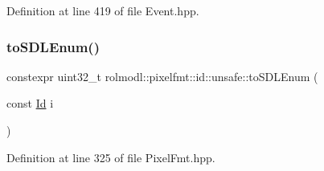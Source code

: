 Definition at line 419 of file Event.\+hpp.

\mbox{\label{namespacerolmodl_1_1pixelfmt_1_1id_1_1unsafe_a0e2c2fca9f1bc5d345511929b84cc97d}} 
\subsubsection{\texorpdfstring{toSDLEnum()}{toSDLEnum()}}
{\footnotesize\ttfamily constexpr uint32\+\_\+t rolmodl\+::pixelfmt\+::id\+::unsafe\+::to\+S\+D\+L\+Enum (\begin{DoxyParamCaption}\item[{const \mbox{\hyperlink{namespacerolmodl_1_1pixelfmt_a96282713e4465ba9211c8fd3a702b52b}{Id}}}]{i }\end{DoxyParamCaption})\hspace{0.3cm}{\ttfamily [noexcept]}}



Definition at line 325 of file Pixel\+Fmt.\+hpp.

